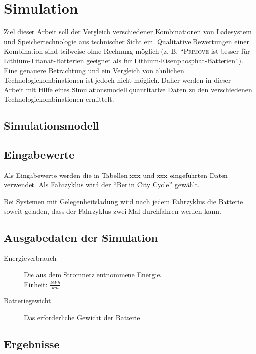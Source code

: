 \chapter{Simulation} %
Ziel dieser Arbeit soll der Vergleich verschiedener Kombinationen von Ladesystem und Speichertechnologie aus technischer Sicht ein. Qualitative Bewertungen einer Kombination sind teilweise ohne Rechnung möglich (z. B. "`\textsc{Primove} ist besser für Lithium-Titanat-Batterien geeignet als für Lithium-Eisenphosphat-Batterien"'). Eine genauere Betrachtung und ein Vergleich von ähnlichen Technologiekombinationen ist jedoch nicht möglich. Daher werden in dieser Arbeit mit Hilfe eines Simulationsmodell quantitative Daten zu den verschiedenen Technologiekombinationen ermittelt.

\section{Simulationsmodell}

\section{Eingabewerte}
Als Eingabewerte werden die in Tabellen xxx und xxx eingeführten Daten verwendet. Als Fahrzyklus wird der "`Berlin City Cycle"' gewählt.

Bei Systemen mit Gelegenheitsladung wird nach jedem Fahrzyklus die Batterie soweit geladen, dass der Fahrzyklus zwei Mal durchfahren werden kann.

\section{Ausgabedaten der Simulation}
\begin{description}
	\item[Energieverbrauch] Die aus dem Stromnetz entnommene Energie.\\
	Einheit: $\frac{kWh}{km}$
	\item[Batteriegewicht] Das erforderliche Gewicht der Batterie 	
\end{description}

\section{Ergebnisse}